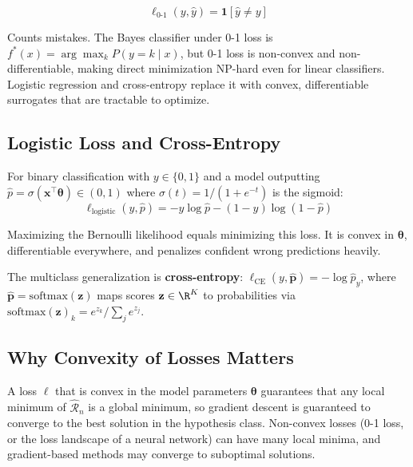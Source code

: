 \documentclass[main.tex]{subfiles}
\begin{document}
$$\ell_{0\text{-}1}(y, \hat{y}) = \mathbf{1}[\hat{y} \neq y]$$

Counts mistakes. The Bayes classifier under 0-1 loss is $f^*(x) = \arg\max_k P(y = k \mid x)$, but 0-1 loss is non-convex and non-differentiable, making direct minimization NP-hard even for linear classifiers. Logistic regression and cross-entropy replace it with convex, differentiable surrogates that are tractable to optimize.

\subsection{Logistic Loss and Cross-Entropy}

For binary classification with $y \in \{0, 1\}$ and a model outputting $\hat{p} = \sigma(\mathbf{x}^\top\boldsymbol{\theta}) \in (0, 1)$ where $\sigma(t) = 1/(1 + e^{-t})$ is the sigmoid:
$$\ell_{\text{logistic}}(y, \hat{p}) = -y\log\hat{p} - (1-y)\log(1 - \hat{p})$$

Maximizing the Bernoulli likelihood equals minimizing this loss. It is convex in $\boldsymbol{\theta}$, differentiable everywhere, and penalizes confident wrong predictions heavily.

The multiclass generalization is \textbf{cross-entropy}: $\ell_{\text{CE}}(y, \hat{\mathbf{p}}) = -\log\hat{p}_y$, where $\hat{\mathbf{p}} = \text{softmax}(\mathbf{z})$ maps scores $\mathbf{z} \in \R^K$ to probabilities via $\text{softmax}(\mathbf{z})_k = e^{z_k}/\sum_j e^{z_j}$.

\subsection{Why Convexity of Losses Matters}

A loss $\ell$ that is convex in the model parameters $\boldsymbol{\theta}$ guarantees that any local minimum of $\hat{\mathcal{R}}_n$ is a global minimum, so gradient descent is guaranteed to converge to the best solution in the hypothesis class. Non-convex losses (0-1 loss, or the loss landscape of a neural network) can have many local minima, and gradient-based methods may converge to suboptimal solutions.

\begin{center}
\end{center}
\end{document}
